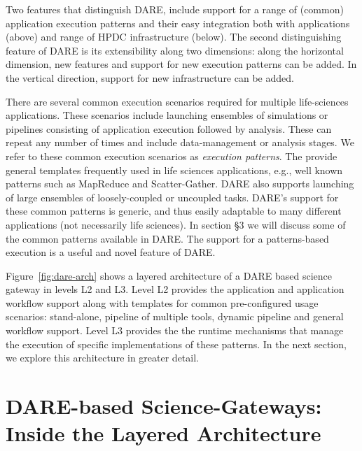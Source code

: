\documentclass[]{svjour3}
\begin{document}

Two features that distinguish DARE, include support for a range of
(common) application execution patterns and their easy integration
both with applications (above) and range of HPDC infrastructure
(below). The second distinguishing feature of DARE is its
extensibility along two dimensions: along the horizontal
dimension, new features and support for new execution patterns can be
added. In the vertical direction, support for new infrastructure can
be added.  

There are several common execution scenarios required for multiple
life-sciences applications. These scenarios include launching
ensembles of simulations or pipelines consisting of application
execution followed by analysis.  These can repeat any number of times
and include data-management or analysis stages. We refer to these
common execution scenarios as {\it execution patterns}. The provide
general templates frequently used in life sciences applications, e.g.,
well known patterns such as MapReduce and Scatter-Gather. DARE also
supports launching of large ensembles of loosely-coupled or uncoupled
tasks.  DARE's support for these common patterns is generic, and thus
easily adaptable to many different applications (not necessarily life
sciences).  In section \S3 we will discuss some of the common patterns
available in DARE. The support for a patterns-based execution is a
useful and novel feature of DARE.

Figure~\ref{fig:dare-arch} shows a layered architecture of a DARE
based science gateway in levels L2 and L3. Level L2 provides the
application and application workflow support along with templates for
common pre-configured usage scenarios: stand-alone, pipeline of
multiple tools, dynamic pipeline and general workflow support. Level
L3 provides the the runtime mechanisms that manage the execution of
specific implementations of these patterns. In the next section, we
explore this architecture in greater detail.

\section{DARE-based Science-Gateways: Inside the Layered Architecture}
\end{document}
